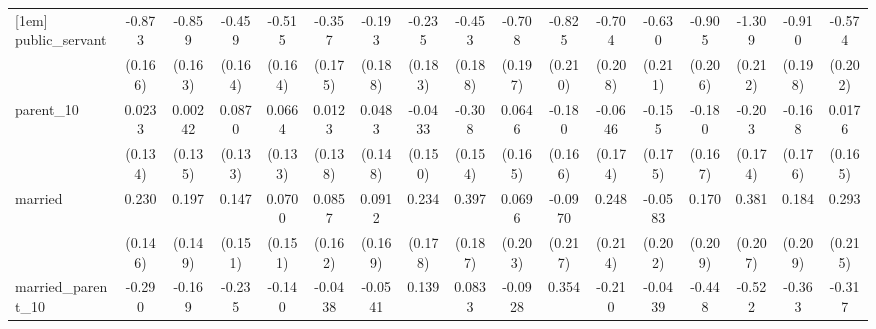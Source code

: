 {\begin{tabular}{l*{16}{c}}
[1em]
public\_servant      &      -0.873\sym{***}&      -0.859\sym{***}&      -0.459\sym{**} &      -0.515\sym{**} &      -0.357\sym{*}  &      -0.193         &      -0.235         &      -0.453\sym{*}  &      -0.708\sym{***}&      -0.825\sym{***}&      -0.704\sym{***}&      -0.630\sym{**} &      -0.905\sym{***}&      -1.309\sym{***}&      -0.910\sym{***}&      -0.574\sym{**} \\
                    &     (0.166)         &     (0.163)         &     (0.164)         &     (0.164)         &     (0.175)         &     (0.188)         &     (0.183)         &     (0.188)         &     (0.197)         &     (0.210)         &     (0.208)         &     (0.211)         &     (0.206)         &     (0.212)         &     (0.198)         &     (0.202)         \\
[1em]
parent\_10           &      0.0233         &     0.00242         &      0.0870         &      0.0664         &      0.0123         &      0.0483         &     -0.0433         &      -0.308\sym{*}  &      0.0646         &      -0.180         &     -0.0646         &      -0.155         &      -0.180         &      -0.203         &      -0.168         &      0.0176         \\
                    &     (0.134)         &     (0.135)         &     (0.133)         &     (0.133)         &     (0.138)         &     (0.148)         &     (0.150)         &     (0.154)         &     (0.165)         &     (0.166)         &     (0.174)         &     (0.175)         &     (0.167)         &     (0.174)         &     (0.176)         &     (0.165)         \\
[1em]
married             &       0.230         &       0.197         &       0.147         &      0.0700         &      0.0857         &      0.0912         &       0.234         &       0.397\sym{*}  &      0.0696         &     -0.0970         &       0.248         &     -0.0583         &       0.170         &       0.381         &       0.184         &       0.293         \\
                    &     (0.146)         &     (0.149)         &     (0.151)         &     (0.151)         &     (0.162)         &     (0.169)         &     (0.178)         &     (0.187)         &     (0.203)         &     (0.217)         &     (0.214)         &     (0.202)         &     (0.209)         &     (0.207)         &     (0.209)         &     (0.215)         \\
[1em]
married\_parent\_10   &      -0.290         &      -0.169         &      -0.235         &      -0.140         &     -0.0438         &     -0.0541         &       0.139         &      0.0833         &     -0.0928         &       0.354         &      -0.210         &     -0.0439         &      -0.448         &      -0.522         &      -0.363         &      -0.317         \\

\end{tabular}}

